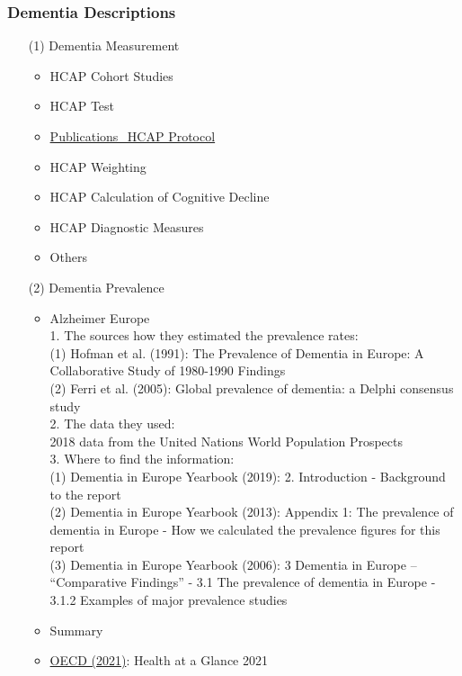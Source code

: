 \documentclass[12pt]{article}
\begin{document}
\subsubsection{Dementia Descriptions}
\begin{itemize}
    \item[(1)] Dementia Measurement
    \begin{itemize}
        \item HCAP Cohort Studies
        \item HCAP Test
        \item \href{https://hcap.isr.umich.edu/publications/}{Publications\_HCAP Protocol}
        \item HCAP Weighting
        \item HCAP Calculation of Cognitive Decline
        \item HCAP Diagnostic Measures
        \item Others
    \end{itemize}
    \item[(2)] Dementia Prevalence
    \begin{itemize}
        \item Alzheimer Europe \\
        1. The sources how they estimated the prevalence rates: \\
        (1) Hofman et al. (1991): The Prevalence of Dementia in Europe: A Collaborative Study of 1980-1990 Findings \\
        (2) Ferri et al. (2005): Global prevalence of dementia: a Delphi consensus study \\
        2. The data they used: \\
        2018 data from the United Nations World Population Prospects \\
        3. Where to find the information: \\
        (1) Dementia in Europe Yearbook (2019): 2. Introduction - Background to the report  \\
        (2) Dementia in Europe Yearbook (2013): Appendix 1: The prevalence of dementia in Europe - How we calculated the prevalence figures for this report \\
        (3) Dementia in Europe Yearbook (2006): 3 Dementia in Europe – “Comparative Findings” - 3.1 The prevalence of dementia in Europe - 3.1.2 Examples of major prevalence studies
        \item Summary
        \item \href{https://www.oecd-ilibrary.org/social-issues-migration-health/health-at-a-glance-2021_ae3016b9-en}{OECD (2021)}: Health at a Glance 2021

\end{itemize}
\end{itemize}
\end{document}
